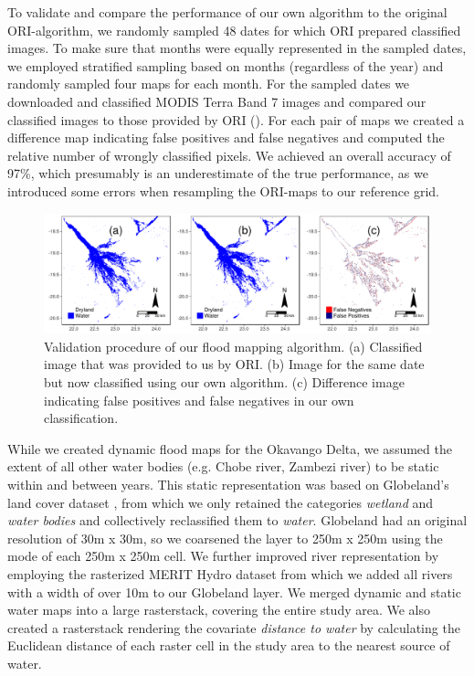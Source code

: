 \documentclass[abstract=off,10pt,a4paper,bibliography=totocnumbered]{article}
\begin{document}
To validate and compare the performance of our own algorithm to the original
ORI-algorithm, we randomly sampled 48 dates for which ORI prepared classified
images. To make sure that months were equally represented in the sampled dates,
we employed stratified sampling based on months (regardless of the year) and
randomly sampled four maps for each month. For the sampled dates we downloaded
and classified MODIS Terra Band 7 images and compared our classified images to
those provided by ORI (). For each pair of maps we
created a difference map indicating false positives and false negatives and
computed the relative number of wrongly classified pixels. We achieved an
overall accuracy of 97\%, which presumably is an underestimate of the true
performance, as we introduced some errors when resampling the ORI-maps to our
reference grid.

\begin{figure}[hbtp]
  \begin{center}
    \includegraphics[width = \textwidth]{99_FloodmappingValidation.pdf}
    \caption{Validation procedure of our flood mapping algorithm. (a) Classified
    image that was provided to us by ORI. (b) Image for the same date but now
    classified using our own algorithm. (c) Difference image indicating false
    positives and false negatives in our own classification.}
    \label{FloodmappingValidation}
  \end{center}
\end{figure}

\noindent While we created dynamic flood maps for the Okavango Delta, we assumed
the extent of all other water bodies (e.g. Chobe river, Zambezi river) to be
static within and between years. This static representation was based on
Globeland's land cover dataset \citep{Chen.2015}, from which we only retained
the categories \textit{wetland} and \textit{water bodies} and collectively
reclassified them to \textit{water}. Globeland had an original resolution of 30m
x 30m, so we coarsened the layer to 250m x 250m using the mode of each 250m x
250m cell. We further improved river representation by employing the rasterized
MERIT Hydro dataset \citep{Yamazaki.2019} from which we added all rivers with a
width of over 10m to our Globeland layer. We merged dynamic and static water
maps into a large rasterstack, covering the entire study area. We also created a
rasterstack rendering the covariate \textit{distance to water} by calculating
the Euclidean distance of each raster cell in the study area to the nearest
source of water.
\end{document}
